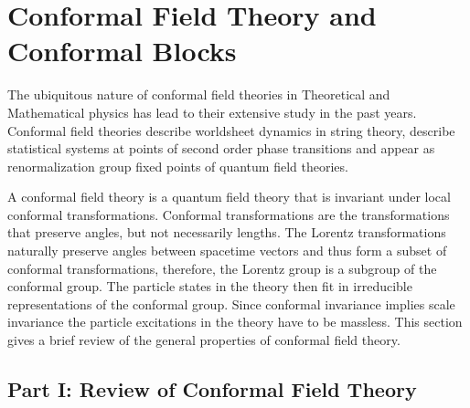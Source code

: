 \chapter{Conformal Field Theory and Conformal Blocks}

The ubiquitous nature of conformal field theories in Theoretical and Mathematical physics has lead to their extensive study in the past years. Conformal field theories describe worldsheet dynamics in string theory, describe statistical systems at points of second order phase transitions and appear as renormalization group fixed points of quantum field theories.

A conformal field theory is a quantum field theory that is invariant under local conformal transformations. Conformal transformations are the transformations that preserve angles, but not necessarily lengths. The Lorentz transformations naturally preserve angles between spacetime vectors and thus form a subset of conformal transformations, therefore, the Lorentz group is a subgroup of the conformal group. The particle states in the theory then fit in irreducible representations of the conformal group. Since conformal invariance implies scale invariance the particle excitations in the theory have to be massless. This section gives a brief review of the general properties of conformal field theory.

  \section{Part I: Review of Conformal Field Theory}
